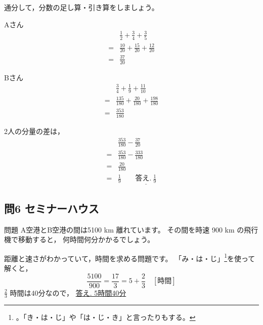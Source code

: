 \documentclass[a5paper]{ltjsarticle}
\begin{document}
通分して，分数の足し算・引き算をしましょう。
\begin{multicols}{2}
Aさん
\begin{align*}
  &\frac{1}{2}+\frac{3}{4}+\frac{3}{5}\\
  =&\frac{10}{20}+\frac{15}{20}+\frac{12}{20}\\
  =&\frac{37}{20}
\end{align*}

Bさん
\begin{align*}
  &\frac{3}{4}+\frac{1}{9}+\frac{11}{10}\\
  =&\frac{135}{180}+\frac{20}{180}+\frac{198}{180}\\
  =&\frac{353}{180}
\end{align*}
\end{multicols}
2人の分量の差は，
\begin{align*}
  &\frac{353}{180}-\frac{37}{20}\\
  =&\frac{353}{180}-\frac{333}{180}\\
  =&\frac{20}{180}\\
  =&\frac{1}{9}\qquad \underline{\text{答え.}\: \frac{1}{9} }
\end{align*}


\subsection*{問6 セミナーハウス}
\begin{itembox}[l]{問題}
  A空港とB空港の間は5100 km 離れています。
  その間を時速 900 km の飛行機で移動すると，
  何時間何分かかるでしょう。
\end{itembox}

距離と速さがわかっていて，時間を求める問題です。
「み・は・じ」\footnote{。「き・は・じ」や「は・じ・き」と言ったりもする。}を使って解くと，
\[\frac{5100}{900}=\frac{17}{3}=5+\frac{2}{3} \quad [\text{時間}]\]
$\displaystyle \frac{2}{3}$ 時間は40分なので，\qquad
\underline{答え. 5時間40分}
\end{document}
